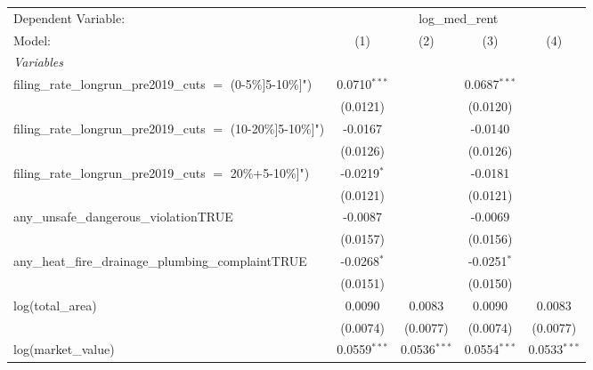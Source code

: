 \begingroup
\centering
\begin{tabular}{lcccc}
   \tabularnewline \midrule \midrule
   Dependent Variable: & \multicolumn{4}{c}{log\_med\_rent}\\
   Model:                                                            & (1)            & (2)             & (3)             & (4)\\  
   \midrule
   \emph{Variables}\\
   filing\_rate\_longrun\_pre2019\_cuts $=$ (0-5\%]5-10\%]")         & 0.0710$^{***}$ &                 & 0.0687$^{***}$  &   \\   
                                                                     & (0.0121)       &                 & (0.0120)        &   \\   
   filing\_rate\_longrun\_pre2019\_cuts $=$ (10-20\%]5-10\%]")       & -0.0167        &                 & -0.0140         &   \\   
                                                                     & (0.0126)       &                 & (0.0126)        &   \\   
   filing\_rate\_longrun\_pre2019\_cuts $=$ 20\%+5-10\%]")           & -0.0219$^{*}$  &                 & -0.0181         &   \\   
                                                                     & (0.0121)       &                 & (0.0121)        &   \\   
   any\_unsafe\_dangerous\_violationTRUE                             & -0.0087        &                 & -0.0069         &   \\   
                                                                     & (0.0157)       &                 & (0.0156)        &   \\   
   any\_heat\_fire\_drainage\_plumbing\_complaintTRUE                & -0.0268$^{*}$  &                 & -0.0251$^{*}$   &   \\   
                                                                     & (0.0151)       &                 & (0.0150)        &   \\   
   log(total\_area)                                                  & 0.0090         & 0.0083          & 0.0090          & 0.0083\\   
                                                                     & (0.0074)       & (0.0077)        & (0.0074)        & (0.0077)\\   
   log(market\_value)                                                & 0.0559$^{***}$ & 0.0536$^{***}$  & 0.0554$^{***}$  & 0.0533$^{***}$\\   

\end{tabular}
